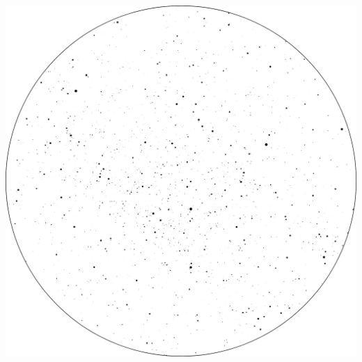 \documentclass{./SAS-class-skygen}
\begin{document}
	\vspace{0.5cm}
    \begin{center}
    \includegraphics[width=\textwidth]{./pics/sky_chart_406436210.png}
    \end{center}
    
    
\end{document}
